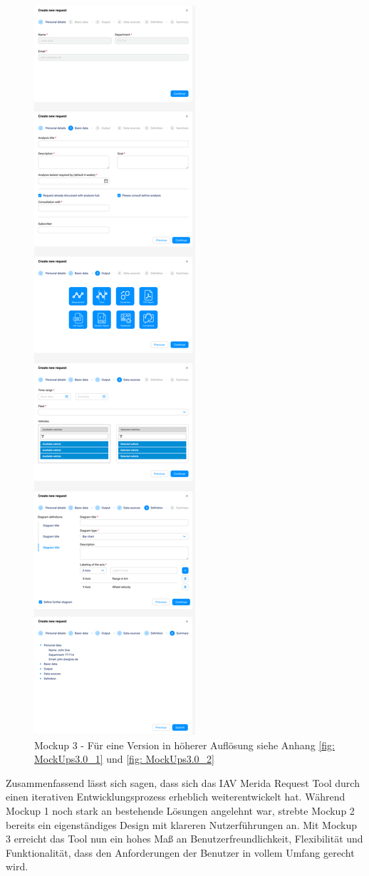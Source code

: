 \begin{figure}[H]
    \centering
    \includegraphics[scale=.25]{media/MockUps3.0}
    \caption{Mockup 3 - Für eine Version in höherer Auflösung siehe Anhang \ref{fig: MockUps3.0_1} und \ref{fig: MockUps3.0_2}}
    \label{fig:MockUps3.0}
\end{figure}
Zusammenfassend lässt sich sagen, dass sich das IAV Merida Request Tool durch einen iterativen Entwicklungsprozess erheblich weiterentwickelt hat. Während Mockup 1 noch stark an bestehende Lösungen angelehnt war, strebte Mockup 2 bereits ein eigenständiges Design mit klareren Nutzerführungen an. Mit Mockup 3 erreicht das Tool nun ein hohes Maß an Benutzerfreundlichkeit, Flexibilität und Funktionalität, dass den Anforderungen der Benutzer in vollem Umfang gerecht wird.
\newpage
